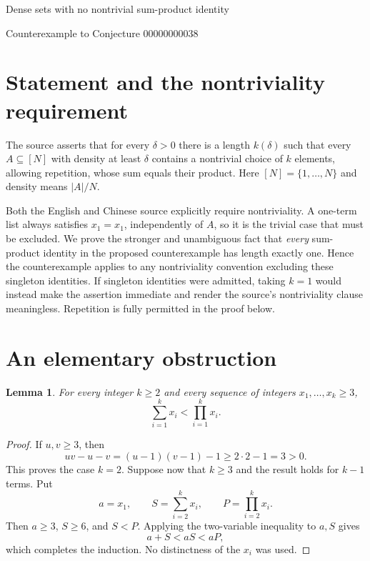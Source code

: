 \documentclass[11pt]{article}
\newtheorem{lemma}{Lemma}
\begin{document}
\begin{center}
{\Large Dense sets with no nontrivial sum-product identity\par}
\medskip
{\large Counterexample to Conjecture 00000000038\par}
\end{center}

\begin{abstract}
For every integer $N\ge4$, the set $A_N=\{3,4,\ldots,N\}$ has density at
least $1/2$ in $[N]$ and admits no identity
$x_1+\cdots+x_k=x_1\cdots x_k$ of length $k\ge2$, even with repeated
choices. Thus Conjecture 00000000038 is false. The accompanying Lean 4
proof verifies the inequality for arbitrary finite lists, the exact
cardinality and density, arbitrarily large counterexamples, and the
negation of the conjecture even with an additional eventual-$N$ threshold.
\end{abstract}

\section{Statement and the nontriviality requirement}
The source asserts that for every $\delta>0$ there is a length $k(\delta)$
such that every $A\subseteq[N]$ with density at least $\delta$ contains a
nontrivial choice of $k$ elements, allowing repetition, whose sum equals
their product. Here $[N]=\{1,\ldots,N\}$ and density means $|A|/N$.

Both the English and Chinese source explicitly require nontriviality.
A one-term list always satisfies $x_1=x_1$, independently of $A$, so it
is the trivial case that must be excluded. We prove the stronger and
unambiguous fact that \emph{every} sum-product identity in the proposed
counterexample has length exactly one. Hence the counterexample applies
to any nontriviality convention excluding these singleton identities.
If singleton identities were admitted, taking $k=1$ would instead make
the assertion immediate and render the source's nontriviality clause
meaningless. Repetition is fully permitted in the proof below.

\section{An elementary obstruction}
\begin{lemma}\label{lem:inequality}
For every integer $k\ge2$ and every sequence of integers
$x_1,\ldots,x_k\ge3$,
\[
 \sum_{i=1}^k x_i < \prod_{i=1}^k x_i.
\]
\end{lemma}
\begin{proof}
If $u,v\ge3$, then
\[
 uv-u-v=(u-1)(v-1)-1\ge 2\cdot2-1=3>0.
\]
This proves the case $k=2$. Suppose now that $k\ge3$ and the result holds
for $k-1$ terms. Put
\[
 a=x_1,\qquad S=\sum_{i=2}^k x_i,\qquad
 P=\prod_{i=2}^k x_i.
\]
Then $a\ge3$, $S\ge6$, and $S<P$. Applying the two-variable inequality
to $a,S$ gives
\[
 a+S<aS<aP,
\]
which completes the induction. No distinctness of the $x_i$ was used.
\end{proof}
\end{document}

